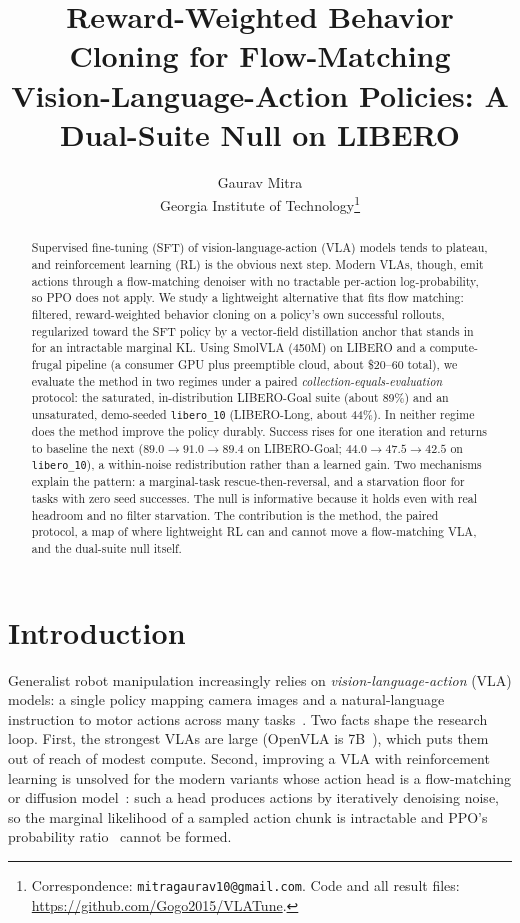 \documentclass[11pt]{article}
\title{\textbf{Reward-Weighted Behavior Cloning for Flow-Matching\\
Vision-Language-Action Policies: A Dual-Suite Null on LIBERO}}
\author{
  Gaurav Mitra\\
  Georgia Institute of Technology\thanks{Correspondence: \texttt{mitragaurav10@gmail.com}. Code and
  all result files: \url{https://github.com/Gogo2015/VLATune}.}
}
\date{}
\newcommand{\libgoal}{LIBERO-Goal}
\newcommand{\libten}{\texttt{libero\_10}}
\begin{document}
\maketitle

\begin{abstract}
Supervised fine-tuning (SFT) of vision-language-action (VLA) models tends to plateau, and
reinforcement learning (RL) is the obvious next step. Modern VLAs, though, emit actions through a
flow-matching denoiser with no tractable per-action log-probability, so PPO does not apply. We
study a lightweight alternative that fits flow matching: filtered, reward-weighted behavior
cloning on a policy's own successful rollouts, regularized toward the SFT policy by a vector-field
distillation anchor that stands in for an intractable marginal KL. Using SmolVLA (450M) on LIBERO
and a compute-frugal pipeline (a consumer GPU plus preemptible cloud, about \$20--60 total), we
evaluate the method in two regimes under a paired \emph{collection-equals-evaluation} protocol:
the saturated, in-distribution \libgoal{} suite (about 89\%) and an unsaturated, demo-seeded
\libten{} (LIBERO-Long, about 44\%). In neither regime does the method improve the policy durably.
Success rises for one iteration and returns to baseline the next ($89.0 \to 91.0 \to 89.4$ on
\libgoal{}; $44.0 \to 47.5 \to 42.5$ on \libten{}), a within-noise redistribution rather than a
learned gain. Two mechanisms explain the pattern: a marginal-task rescue-then-reversal, and a
starvation floor for tasks with zero seed successes. The null is informative because it holds even
with real headroom and no filter starvation. The contribution is the method, the paired protocol,
a map of where lightweight RL can and cannot move a flow-matching VLA, and the dual-suite null
itself.
\end{abstract}

\section{Introduction}

Generalist robot manipulation increasingly relies on \emph{vision-language-action} (VLA) models: a
single policy mapping camera images and a natural-language instruction to motor actions across
many tasks~\citep{kim2024openvla,shukor2025smolvla}. Two facts shape the research loop. First, the
strongest VLAs are large (OpenVLA is 7B~\citep{kim2024openvla}), which puts them out of reach of
modest compute. Second, improving a VLA with reinforcement learning is unsolved for the modern
variants whose action head is a flow-matching or diffusion model~\citep{chi2023diffusion,lipman2023flow}:
such a head produces actions by iteratively denoising noise, so the marginal likelihood of a
sampled action chunk is intractable and PPO's probability ratio~\citep{schulman2017ppo} cannot be
formed.
\end{document}
